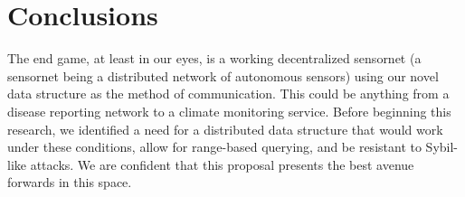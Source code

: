 \documentclass[10pt]{IEEEtran}
\begin{document}
\section{Conclusions}
\par The end game, at least in our eyes, is a working decentralized sensornet (a sensornet being a distributed network of autonomous sensors) using our novel data structure as the method of communication. This could be anything from a disease reporting network to a climate monitoring service. Before beginning this research, we identified a need for a distributed data structure that would work under these conditions, allow for range-based querying, and be resistant to Sybil-like attacks. We are confident that this proposal presents the best avenue forwards in this space.



\printbibliography
\end{document}
